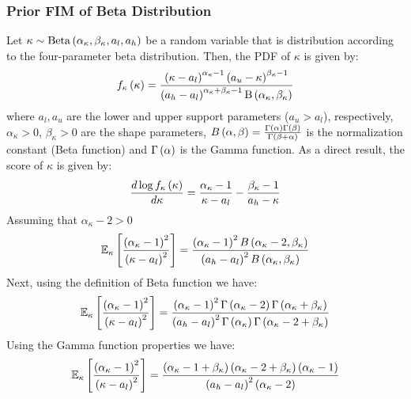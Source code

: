 \subsubsection{Prior FIM of Beta Distribution}
Let $\kappa\sim\mathrm{Beta}\left(\alpha_{\kappa},\beta_{\kappa},a_l,a_h\right)$ be a random variable that is distribution according to the four-parameter beta distribution. Then, the PDF of $\kappa$ is given by:
\begin{equation}
    f_{\kappa}\left(\kappa\right)=\frac{\left(\kappa-a_l\right)^{\alpha_{\kappa}-1}\left(a_u-\kappa\right)^{\beta_{\kappa}-1}}{\left(a_h-a_l\right)^{\alpha_{\kappa}+\beta_{\kappa}-1}\mathrm{B}\left(\alpha_{\kappa},\beta_{\kappa}\right)}
\end{equation}
where  $a_l,a_u$ are the lower and upper support parameters ($a_u>a_l$), respectively, $\alpha_{\kappa}>0$, $\beta_{\kappa}>0$ are the shape parameters, $B\left(\alpha,\beta\right)=\frac{\Gamma\left(\alpha\right)\Gamma\left(\beta\right)}{\Gamma\left(\beta+\alpha\right)}$ is the normalization constant (Beta function) and $\Gamma\left(\alpha\right)$ is the Gamma function.
As a direct result, the score of $\kappa$ is given by:
\begin{equation}
    \frac{d \log f_{\kappa}\left(\kappa\right)}{d\kappa}=\frac{\alpha_{\kappa}-1}{\kappa-a_l}-\frac{\beta_{\kappa}-1}{a_h-\kappa}
\end{equation}
Assuming that $\alpha_{\kappa}-2>0$
\begin{equation}
    \mathbb{E}_{\kappa}\left[\frac{\left(\alpha_{\kappa}-1\right)^2}{\left(\kappa-a_l\right)^2}\right]=\frac{ \left(\alpha_{\kappa}-1\right)^2B\left(\alpha_{\kappa}-2,\beta_{\kappa}\right)}{\left(a_h-a_l\right)^{2} B\left(\alpha_{\kappa},\beta_{\kappa}\right)}
\end{equation}
Next, using the definition of Beta function we have:
\begin{equation}
    \mathbb{E}_{\kappa}\left[\frac{\left(\alpha_{\kappa}-1\right)^2}{\left(\kappa-a_l\right)^2}\right]=\frac{ \left(\alpha_{\kappa}-1\right)^2\Gamma\left(\alpha_{\kappa}-2\right)\Gamma\left(\alpha_{\kappa}+\beta_{\kappa}\right)}{\left(a_h-a_l\right)^{2} \Gamma\left(\alpha_{\kappa}\right)\Gamma\left(\alpha_{\kappa}-2+\beta_{\kappa}\right)}
\end{equation}
Using the Gamma function properties we have:
\begin{equation}\label{eq:beta_prior_p1}
\mathbb{E}_{\kappa}\left[\frac{\left(\alpha_{\kappa}-1\right)^2}{\left(\kappa-a_l\right)^2}\right]=\frac{ \left(\alpha_{\kappa}-1+\beta_{\kappa}\right)\left(\alpha_{\kappa}-2+\beta_{\kappa}\right)\left(\alpha_{\kappa}-1\right)}{\left(a_h-a_l\right)^{2} \left(\alpha_{\kappa}-2\right)}
\end{equation}

